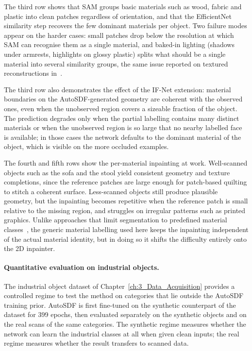 The third row shows that SAM groups basic materials such as wood, fabric and plastic into clean patches regardless of orientation, and that the EfficientNet similarity step recovers the few dominant materials per object. Two failure modes appear on the harder cases: small patches drop below the resolution at which SAM can recognise them as a single material, and baked-in lighting (shadows under armrests, highlights on glossy plastic) splits what should be a single material into several similarity groups, the same issue reported on textured reconstructions in~\cite{siddiqui_retrievalfuse_2021}.
 
The third row also demonstrates the effect of the IF-Net extension: material boundaries on the AutoSDF-generated geometry are coherent with the observed ones, even when the unobserved region covers a sizeable fraction of the object. The prediction degrades only when the partial labelling contains many distinct materials or when the unobserved region is so large that no nearby labelled face is available; in those cases the network defaults to the dominant material of the object, which is visible on the more occluded examples.
 
The fourth and fifth rows show the per-material inpainting at work. Well-scanned objects such as the sofa and the stool yield consistent geometry and texture completions, since the reference patches are large enough for patch-based quilting to stitch a coherent surface. Less-scanned objects still produce plausible geometry, but the inpainting becomes repetitive when the reference patch is small relative to the missing region, and struggles on irregular patterns such as printed graphics. Unlike approaches that limit segmentation to predefined material classes~\cite{stets_material-based_2019}, the generic material labelling used here keeps the inpainting independent of the actual material identity, but in doing so it shifts the difficulty entirely onto the 2D inpainter.
 
 
\paragraph{Quantitative evaluation on industrial objects.}
The industrial object dataset of Chapter~\ref{ch:3_Data_Acquisition} provides a controlled regime to test the method on categories that lie outside the AutoSDF training prior. AutoSDF is first fine-tuned on the synthetic counterpart of the dataset for 399 epochs, then evaluated separately on the synthetic objects and on the real scans of the same categories. The synthetic regime measures whether the network can learn the industrial classes at all when given clean inputs; the real regime measures whether the result transfers to scanned data.
 
